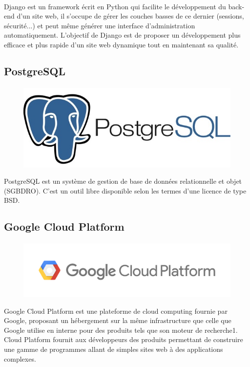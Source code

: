 \documentclass[]{report}
\begin{document}
			\paragraph{}
			Django est un framework écrit en Python qui facilite le développement du back-end d'un site web, il s'occupe de gérer les couches basses de ce dernier (sessions, sécurité...)   et peut même générer une interface d'administration automatiquement. L’objectif  de Django est de proposer un développement plus efficace et plus rapide d'un site web dynamique tout en maintenant sa qualité.
		\subsection{PostgreSQL}
			\paragraph{}
			\begin{figure}[H]
				\centering
				\includegraphics[width=0.25\linewidth]{images/postgresql.jpg}
			\end{figure}
			PostgreSQL est un système de gestion de base de données relationnelle et objet (SGBDRO). C'est un outil libre disponible selon les termes d'une licence de type BSD.
		
		\subsection{Google Cloud Platform}
			\paragraph{}
			\begin{figure}[H]
				\centering
				\includegraphics[width=0.35\linewidth]{images/gcp.png}
			\end{figure}
		Google Cloud Platform est une plateforme de cloud computing fournie par Google, proposant un hébergement sur la même infrastructure que celle que Google utilise en interne pour des produits tels que son moteur de recherche1. Cloud Platform fournit aux développeurs des produits permettant de construire une gamme de programmes allant de simples sites web à des applications complexes.
	
\end{document}
